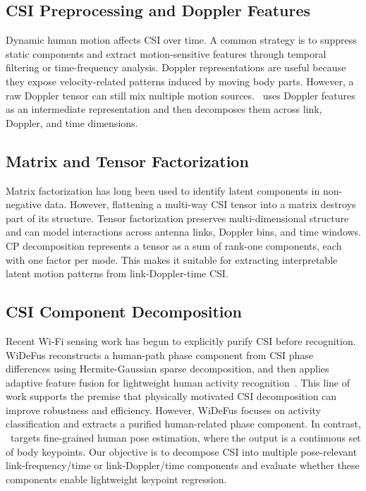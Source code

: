 \documentclass[10pt,journal]{IEEEtran}
\newcommand{\method}{\mathtt{DePose\mbox{-}Fi}}
\begin{document}
\subsection{CSI Preprocessing and Doppler Features}

Dynamic human motion affects CSI over time. A common strategy is to suppress static components and extract motion-sensitive features through temporal filtering or time-frequency analysis. Doppler representations are useful because they expose velocity-related patterns induced by moving body parts. However, a raw Doppler tensor can still mix multiple motion sources. \method\ uses Doppler features as an intermediate representation and then decomposes them across link, Doppler, and time dimensions.

\subsection{Matrix and Tensor Factorization}

Matrix factorization has long been used to identify latent components in non-negative data. However, flattening a multi-way CSI tensor into a matrix destroys part of its structure. Tensor factorization preserves multi-dimensional structure and can model interactions across antenna links, Doppler bins, and time windows. CP decomposition represents a tensor as a sum of rank-one components, each with one factor per mode. This makes it suitable for extracting interpretable latent motion patterns from link-Doppler-time CSI.

\subsection{CSI Component Decomposition}

Recent Wi-Fi sensing work has begun to explicitly purify CSI before recognition. WiDeFus reconstructs a human-path phase component from CSI phase differences using Hermite-Gaussian sparse decomposition, and then applies adaptive feature fusion for lightweight human activity recognition~\cite{widefus2026}. This line of work supports the premise that physically motivated CSI decomposition can improve robustness and efficiency. However, WiDeFus focuses on activity classification and extracts a purified human-related phase component. In contrast, \method\ targets fine-grained human pose estimation, where the output is a continuous set of body keypoints. Our objective is to decompose CSI into multiple pose-relevant link-frequency/time or link-Doppler/time components and evaluate whether these components enable lightweight keypoint regression.
\end{document}

